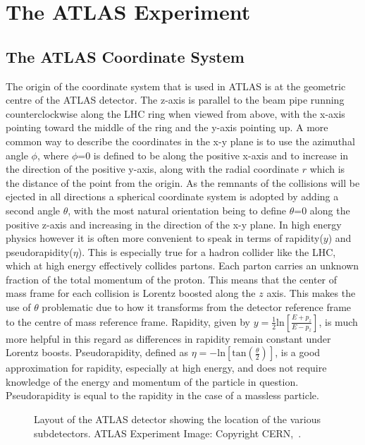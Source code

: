\section{The ATLAS Experiment}
\label{Sec:ATLAS}

\subsection{The ATLAS Coordinate System}

The origin of the coordinate system that is used in ATLAS is at the geometric centre of the ATLAS detector.  
The z-axis is parallel to the beam pipe running counterclockwise along the LHC ring when viewed from above, with the x-axis pointing toward the middle of the ring and the y-axis pointing up.  
A more common way to describe the coordinates in the x-y plane is to use the azimuthal angle $\phi$, where $\phi$=0 is defined to be along the positive x-axis and to increase in the direction of the positive y-axis, along with the radial coordinate $r$ which is the distance of the point from the origin.  
As the remnants of the collisions will be ejected in all directions a spherical coordinate system is adopted by adding a second angle $\theta$, with the most natural orientation being to define $\theta$=0 along the positive z-axis and increasing in the direction of the x-y plane.  
In high energy physics however it is often more convenient to speak in terms of rapidity($y$) and pseudorapidity($\eta$).  
This is especially true for a hadron collider like the LHC, which at high energy effectively collides partons.  
Each parton carries an unknown fraction of the total momentum of the proton.  
This means that the center of mass frame for each collision is Lorentz boosted along the $z$ axis.  
This makes the use of $\theta$ problematic due to how it transforms from the detector reference frame to the centre of mass reference frame.  
Rapidity, given by $y=\frac{1}{2}\mathrm{ln}\left[\frac{E+p_{z}}{E-p_z}\right]$, is much more helpful in this regard as differences in rapidity remain constant under Lorentz boosts.  
Pseudorapidity, defined as $\eta=-\mathrm{ln}\left[\mathrm{tan}\left(\frac{\theta}{2}\right)\right]$, is a good approximation for rapidity, especially at high energy, and does not require knowledge of the energy and momentum of the particle in question.  
Pseudorapidity is equal to the rapidity in the case of a massless particle.  

\begin{figure}[!ht]
  \begin{center}
  \end{center}
  \caption[Layout of the ATLAS detector]
  {\small Layout of the ATLAS detector showing the location of the various subdetectors.  ATLAS Experiment Image: Copyright CERN,~\cite{Pequenao:1095924}.}
\end{figure}

